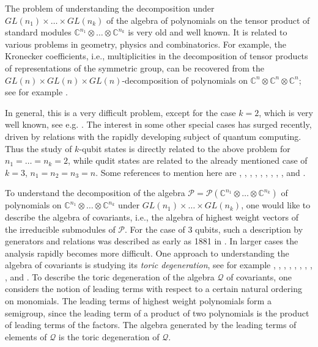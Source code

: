 \documentclass[reqno,11pt]{amsart}
\theoremstyle{remark}
\theoremstyle{definition}
\numberwithin{equation}{section}
\newcommand{\cal}{\mathcal}
\newcommand{\bbC}{\mathbb{C}}
\begin{document}
The problem of understanding the decomposition under $GL(n_1)\times\dots\times GL(n_k)$ of the algebra of polynomials on the tensor product of standard modules $\bbC^{n_1}\otimes\dots\otimes\bbC^{n_k}$ is very old and well known. It is related to various problems in geometry, physics and combinatorics. For example, the Kronecker coefficients, i.e., multiplicities in the decomposition of tensor products of representations of the  symmetric group, can be recovered from the $GL(n)\times GL(n)\times GL(n)$-decomposition of polynomials on $\bbC^n\otimes\bbC^n\otimes\bbC^n$; see for example \cite{BV}. 

In general, this is a  very difficult problem, except for the case $k=2$, which is very well known, see e.g. \cite{H}. 
The interest in some other special cases has surged recently, driven by relations with the rapidly developing subject of quantum computing. Thus the study of $k$-qubit states is directly related to the above problem for $n_1=\dots =n_k=2$, while qudit states are related to the already mentioned case of $k=3$, $n_1=n_2=n_3=n$. Some references to mention here are \cite{La}, \cite{W}, \cite{BLT}, \cite{Bri}, \cite{Lu}, \cite{WDGC},  
\cite{B}, \cite{BB}, \cite{MW1}, \cite{MW2} and \cite{FH}.

To understand the decomposition of the algebra $\cal P=\cal P(\bbC^{n_1}\otimes\dots\otimes\bbC^{n_k})$ of polynomials on $\bbC^{n_1}\otimes\dots\otimes\bbC^{n_k}$  under $GL(n_1)\times\dots\times GL(n_k)$, one would like to describe the algebra of covariants, i.e., the algebra of highest weight vectors of the irreducible submodules of $\cal P$. For the case of 3 qubits, such a description by generators and relations was described as early as  1881 in \cite{LP}. In larger cases the analysis rapidly becomes more difficult.  One approach to understanding the algebra of covariants is studying its {\it toric degeneration}, see for example \cite{Ca}, \cite{CHV}, \cite{CLO}, \cite{C}, \cite{GL1}, \cite{GL2}, \cite{H2}, \cite{HJLTW}, \cite{Ka}, \cite{KL} and \cite{KM}. To describe the toric degeneration of the algebra $\cal Q$ of covariants, one considers the notion of leading terms with respect to a certain natural ordering on monomials. The leading terms of highest weight polynomials form a semigroup, since the leading term of a product of two polynomials is the product of leading terms of the factors. The algebra generated by the leading terms of  elements of $\cal Q$ is the toric degeneration of $\cal Q$.
\end{document}
